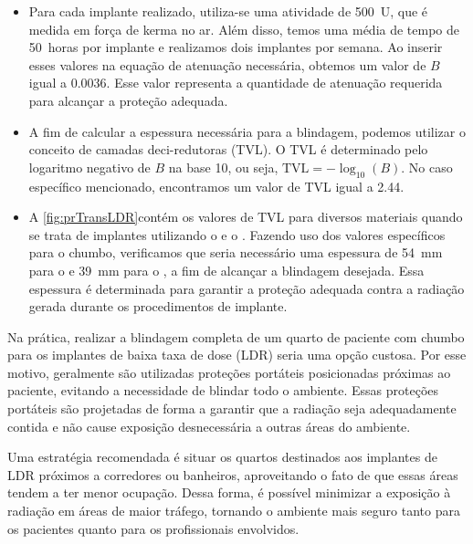 \documentclass[11pt,a4paper]{article}
\begin{document}
	\begin{tcolorbox}[width=\textwidth, colback={white}, colbacktitle={DarkTurquoise!50!white}, title={$\bigstar$ \LobsterTwo{Exemplo: Blindagem LDR} $\bigstar $}, coltitle={CarnationPink}, colframe={DarkTurquoise}, fonttitle=\rmfamily\bfseries\Large]
		\begin{itemize}
			\item Para cada implante realizado, utiliza-se uma atividade de \SI{500}{U}, que é medida em força de kerma no ar. Além disso, temos uma média de tempo de \SI{50}{horas} por implante e realizamos dois implantes por semana. Ao inserir esses valores na equação de atenuação necessária, obtemos um valor de $B$ igual a \num{0.0036}. Esse valor representa a quantidade de atenuação requerida para alcançar a proteção adequada.

			\item A fim de calcular a espessura necessária para a blindagem, podemos utilizar o conceito de camadas deci-redutoras (TVL). O TVL é determinado pelo logaritmo negativo de $B$ na base 10, ou seja, $\text{TVL} = -\log_{10}(B)$. No caso específico mencionado, encontramos um valor de TVL igual a \num{2.44}.
	
			\item A \ref{fig:prTransLDR}contém os valores de TVL para diversos materiais quando se trata de implantes utilizando o  e o . Fazendo uso dos valores específicos para o chumbo, verificamos que seria necessário uma espessura de \SI{54}{mm} para o  e \SI{39}{mm} para o , a fim de alcançar a blindagem desejada. Essa espessura é determinada para garantir a proteção adequada contra a radiação gerada durante os procedimentos de implante.
		\end{itemize}
	\end{tcolorbox}

	Na prática, realizar a blindagem completa de um quarto de paciente com chumbo para os implantes de baixa taxa de dose (LDR) seria uma opção custosa. Por esse motivo, geralmente são utilizadas proteções portáteis posicionadas próximas ao paciente, evitando a necessidade de blindar todo o ambiente. Essas proteções portáteis são projetadas de forma a garantir que a radiação seja adequadamente contida e não cause exposição desnecessária a outras áreas do ambiente.

	Uma estratégia recomendada é situar os quartos destinados aos implantes de LDR próximos a corredores ou banheiros, aproveitando o fato de que essas áreas tendem a ter menor ocupação. Dessa forma, é possível minimizar a exposição à radiação em áreas de maior tráfego, tornando o ambiente mais seguro tanto para os pacientes quanto para os profissionais envolvidos.
\end{document}
